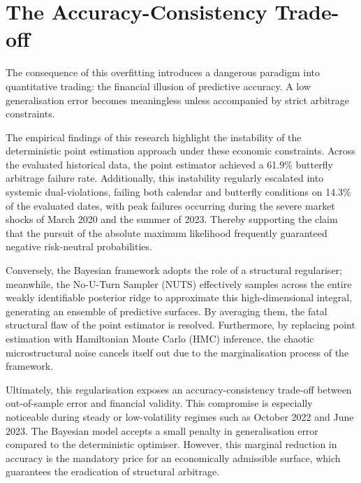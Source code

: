 \documentclass[12pt,oneside]{report}
\theoremstyle{definition}
\theoremstyle{remark}
\begin{document}
\section{The Accuracy-Consistency Trade-off}
The consequence of this overfitting introduces a dangerous paradigm into quantitative trading: the financial illusion of predictive accuracy. A low generalisation error becomes meaningless unless accompanied by strict arbitrage constraints.

The empirical findings of this research highlight the instability of the deterministic point estimation approach under these economic constraints. Across the evaluated historical data, the point estimator achieved a 61.9\% butterfly arbitrage failure rate. Additionally, this instability regularly escalated into systemic dual-violations, failing both calendar and butterfly conditions on 14.3\% of the evaluated dates, with peak failures occurring during the severe market shocks of March 2020 and the summer of 2023. Thereby supporting the claim that the pursuit of the absolute maximum likelihood frequently guaranteed negative risk-neutral probabilities.

Conversely, the Bayesian framework adopts the role of a structural regulariser; meanwhile, the No-U-Turn Sampler (NUTS) effectively samples across the entire weakly identifiable posterior ridge to approximate this high-dimensional integral, generating an ensemble of predictive surfaces. By averaging them, the fatal structural flaw of the point estimator is resolved. Furthermore, by replacing point estimation with Hamiltonian Monte Carlo (HMC) inference, the chaotic microstructural noise cancels itself out due to the marginalisation process of the framework.

Ultimately, this regularisation exposes an accuracy-consistency trade-off between out-of-sample error and financial validity. This compromise is especially noticeable during steady or low-volatility regimes such as October 2022 and June 2023. The Bayesian model accepts a small penalty in generalisation error compared to the deterministic optimiser. However, this marginal reduction in accuracy is the mandatory price for an economically admissible surface, which guarantees the eradication of structural arbitrage.
\end{document}
